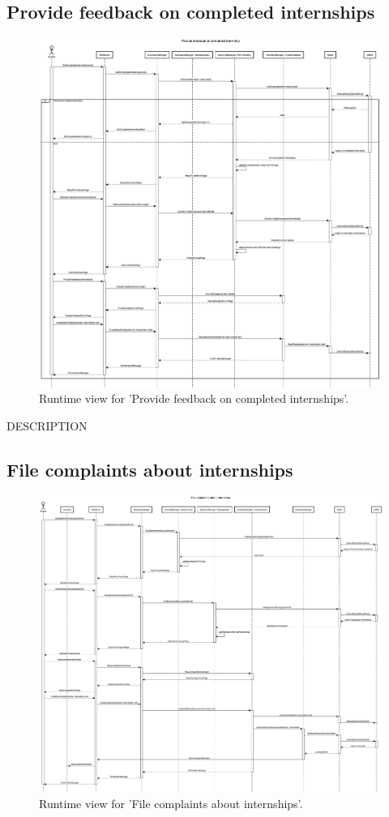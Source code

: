 \subsection{Provide feedback on completed internships}
\begin{figure}[H]
    \begin{center}
        \includegraphics[width=0.8\linewidth]{DD/LaTeX/Images/RuntimeView/ProvideFeedback.png}
        \caption{Runtime view for 'Provide feedback on completed internships'.}
        \label{fig:runtime_ProvideFeedback}%
    \end{center}
\end{figure}

DESCRIPTION


\subsection{File complaints about internships}
\begin{figure}[H]
    \begin{center}
        \includegraphics[width=0.8\linewidth]{DD/LaTeX/Images/RuntimeView/FileComplaints.png}
        \caption{Runtime view for 'File complaints about internships'.}
        \label{fig:runtime_FileComplaints}%
    \end{center}
\end{figure}


